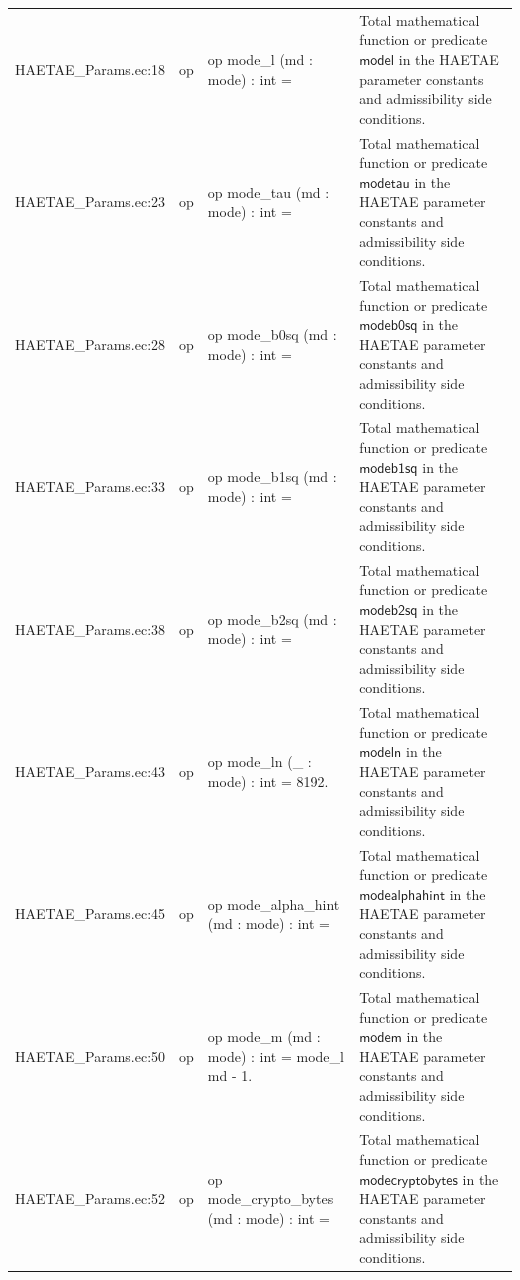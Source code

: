 \documentclass[10pt]{article}
\begin{document}
\begin{longtable}{L{0.11\textwidth}L{0.055\textwidth}L{0.385\textwidth}L{0.41\textwidth}}
HAETAE\_\allowbreak{}Params.\allowbreak{}ec:\allowbreak{}18 & op & {\ttfamily\scriptsize op mode\_\allowbreak{}l (md : mode) : int =} & Total mathematical function or predicate $\mathsf{model}$ in the HAETAE parameter constants and admissibility side conditions. \\
HAETAE\_\allowbreak{}Params.\allowbreak{}ec:\allowbreak{}23 & op & {\ttfamily\scriptsize op mode\_\allowbreak{}tau (md : mode) : int =} & Total mathematical function or predicate $\mathsf{modetau}$ in the HAETAE parameter constants and admissibility side conditions. \\
HAETAE\_\allowbreak{}Params.\allowbreak{}ec:\allowbreak{}28 & op & {\ttfamily\scriptsize op mode\_\allowbreak{}b0sq (md : mode) : int =} & Total mathematical function or predicate $\mathsf{modeb0sq}$ in the HAETAE parameter constants and admissibility side conditions. \\
HAETAE\_\allowbreak{}Params.\allowbreak{}ec:\allowbreak{}33 & op & {\ttfamily\scriptsize op mode\_\allowbreak{}b1sq (md : mode) : int =} & Total mathematical function or predicate $\mathsf{modeb1sq}$ in the HAETAE parameter constants and admissibility side conditions. \\
HAETAE\_\allowbreak{}Params.\allowbreak{}ec:\allowbreak{}38 & op & {\ttfamily\scriptsize op mode\_\allowbreak{}b2sq (md : mode) : int =} & Total mathematical function or predicate $\mathsf{modeb2sq}$ in the HAETAE parameter constants and admissibility side conditions. \\
HAETAE\_\allowbreak{}Params.\allowbreak{}ec:\allowbreak{}43 & op & {\ttfamily\scriptsize op mode\_\allowbreak{}ln (\_\allowbreak{} : mode) : int = 8192.} & Total mathematical function or predicate $\mathsf{modeln}$ in the HAETAE parameter constants and admissibility side conditions. \\
HAETAE\_\allowbreak{}Params.\allowbreak{}ec:\allowbreak{}45 & op & {\ttfamily\scriptsize op mode\_\allowbreak{}alpha\_\allowbreak{}hint (md : mode) : int =} & Total mathematical function or predicate $\mathsf{modealphahint}$ in the HAETAE parameter constants and admissibility side conditions. \\
HAETAE\_\allowbreak{}Params.\allowbreak{}ec:\allowbreak{}50 & op & {\ttfamily\scriptsize op mode\_\allowbreak{}m (md : mode) : int = mode\_\allowbreak{}l md - 1.} & Total mathematical function or predicate $\mathsf{modem}$ in the HAETAE parameter constants and admissibility side conditions. \\
HAETAE\_\allowbreak{}Params.\allowbreak{}ec:\allowbreak{}52 & op & {\ttfamily\scriptsize op mode\_\allowbreak{}crypto\_\allowbreak{}bytes (md : mode) : int =} & Total mathematical function or predicate $\mathsf{modecryptobytes}$ in the HAETAE parameter constants and admissibility side conditions. \\

\end{longtable}
\end{document}
